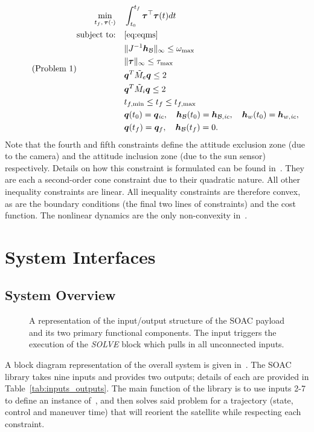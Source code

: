 \documentclass[10pt]{article}
\begin{document}
\begin{equation}\tag{Problem 1}\label{prob:prob1}
\begin{alignedat}{1}
\min_{t_f,\,\bm{\tau}(\cdot)} &\quad \int_{t_0}^{t_f} \bm{\tau}^{\top}\bm{\tau}(t) dt \\
\text{subject to:} &\quad \eqref{eq:eqms} \\
&\quad \| J^{-1}\bm{h}_{\mathcal{B}} \|_{\infty} \leq \omega_{\max} \\
&\quad \| \bm{\tau} \|_{\infty} \leq \tau_{\max} \\
&\quad \bm{q}^T \tilde{M}_e \bm{q} \leq 2 \\
&\quad \bm{q}^T \tilde{M}_i \bm{q} \leq 2 \\
&\quad t_{f,\min} \leq t_f \leq t_{f,\max}\\
&\quad \bm{q}(t_0) = \bm{q}_\textit{ic},\quad \bm{h}_{\mathcal{B}}(t_0)=\bm{h}_{\mathcal{B},\textit{ic}},\quad \bm{h}_w(t_0)=\bm{h}_{w,\textit{ic}}, \\
&\quad \bm{q}(t_f) = \bm{q}_f,\quad \bm{h}_{\mathcal{B}}(t_f) = 0.
\end{alignedat}
\end{equation}
Note that the fourth and fifth constraints define the attitude exclusion zone (due to the camera) and the attitude inclusion zone (due to the sun sensor) respectively. Details on how this constraint is formulated can be found in~\cite{Lee2014}. They are each a second-order cone constraint due to their quadratic nature. All other inequality constraints are linear. All inequality constraints are therefore convex, as are the boundary conditions (the final two lines of constraints) and the cost function. The nonlinear dynamics are the only non-convexity in~.

\section{System Interfaces}\label{sec:interfaces}

\subsection{System Overview}\label{sec2:sys_overview} 

\begin{figure}[tbh]
\centering

\caption{A representation of the input/output structure of the SOAC payload and its two primary functional components. The input  triggers the execution of the \textit{SOLVE} block which pulls in all unconnected inputs.}
\label{fig:soac_inner}
\end{figure}

A block diagram representation of the overall system is given in~. The SOAC library takes nine inputs and provides two outputs; details of each are provided in Table~\ref{tab:inputs_outputs}. The main function of the library is to use inputs 2-7 to define an instance of~, and then solves said problem for a trajectory (state, control and maneuver time) that will reorient the satellite while respecting each constraint. 
\end{document}
